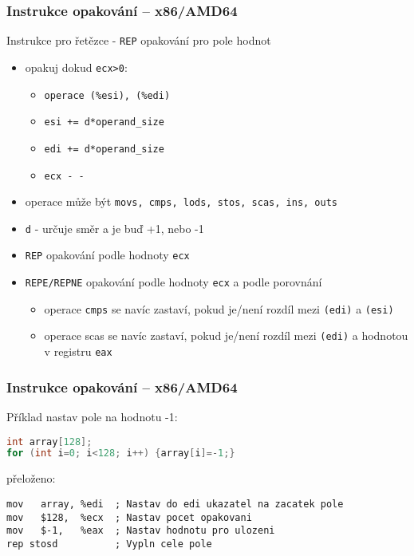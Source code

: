 \documentclass{beamer}
\begin{document}
\begin{frame}
\frametitle{Instrukce opakování – x86/AMD64}
Instrukce pro řetězce  - \texttt{REP} opakování pro pole hodnot
\begin{itemize}
\item opakuj dokud \texttt{ecx>0}:
\begin{itemize}
\item \texttt{operace (\%esi), (\%edi)}
\item \texttt{esi += d*operand\_size}
\item \texttt{edi += d*operand\_size}
\item \texttt{ecx - -}
\end{itemize}
\item operace může být \texttt{movs, cmps, lods, stos, scas, ins, outs}
\item \texttt{d} - určuje směr a je buď +1, nebo -1
\item \texttt{REP} opakování podle hodnoty \texttt{ecx}
\item \texttt{REPE/REPNE} opakování podle hodnoty \texttt{ecx} a podle porovnání
  \begin{itemize}
  \item operace \texttt{cmps} se navíc zastaví, pokud je/není rozdíl mezi \texttt{(edi)} a \texttt{(esi)} 
  \item operace scas se navíc zastaví, pokud je/není rozdíl mezi \texttt{(edi)} a hodnotou v registru \texttt{eax} 
  \end{itemize}
\end{itemize}

\end{frame}


\begin{frame}[fragile]
\frametitle{Instrukce opakování – x86/AMD64}
Příklad nastav pole na hodnotu -1:
\begin{lstlisting}[language={C},columns=flexible]
int array[128];
for (int i=0; i<128; i++) {array[i]=-1;}
\end{lstlisting}
přeloženo:
\begin{lstlisting}[language={[x86masm]Assembler},columns=flexible]
mov   array, %edi  ; Nastav do edi ukazatel na zacatek pole
mov   $128,  %ecx  ; Nastav pocet opakovani
mov   $-1,   %eax  ; Nastav hodnotu pro ulozeni
rep stosd          ; Vypln cele pole
\end{lstlisting}
\end{frame}
\end{document}
